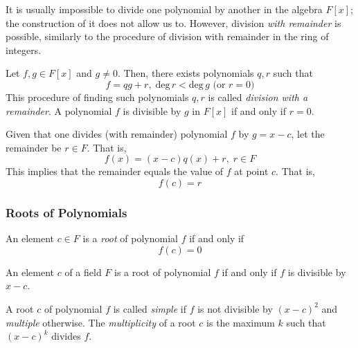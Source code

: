 \documentclass{article}
\begin{document}
      It is usually impossible to divide one polynomial by another in the algebra $F[x]$; the construction of it does not allow us to. However, division \textit{with remainder} is possible, similarly to the procedure of division with remainder in the ring of integers. 

      \begin{theorem}
        Let $f, g \in F[x]$ and $g \neq 0$. Then, there exists polynomials $q, r$ such that 
        \begin{equation}
          f = q g + r, \; \text{deg}\, r < \text{deg}\, g \text{ (or } r = 0 \text{)}
        \end{equation}
        This procedure of finding such polynomials $q, r$ is called \textit{division with a remainder}. A polynomial $f$ is divisible by $g$ in $F[x]$ if and only if $r = 0$. 
      \end{theorem}

      \begin{theorem}
        Given that one divides (with remainder) polynomial $f$ by $g = x - c$, let the remainder be $r \in F$. That is, 
        \begin{equation}
          f(x) = (x-c) q(x) + r, \; r \in F
        \end{equation}
        This implies that the remainder equals the value of $f$ at point $c$. That is, 
        \begin{equation}
          f(c) = r
        \end{equation}
      \end{theorem}

    \subsubsection{Roots of Polynomials}

      \begin{definition}
        An element $c \in F$ is a \textit{root} of polynomial $f$ if and only if 
        \begin{equation}
          f(c) = 0
        \end{equation}
      \end{definition}

      \begin{corollary}
        An element $c$ of a field $F$ is a root of polynomial $f$ if and only if $f$ is divisible by $x - c$. 
      \end{corollary}

      \begin{definition}
        A root $c$ of polynomial $f$ is called \textit{simple} if $f$ is not divisible by $(x-c)^2$ and \textit{multiple} otherwise. The \textit{multiplicity} of a root $c$ is the maximum $k$ such that $(x-c)^k$ divides $f$. 
      \end{definition}
\end{document}
